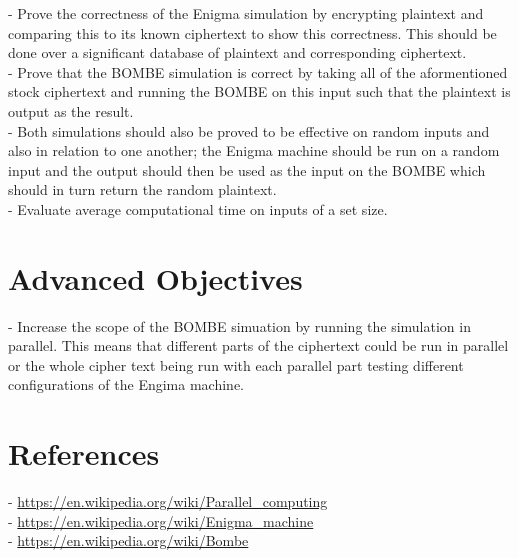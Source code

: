 \documentclass[a4paper, 11pt]{article}
\begin{document}
- Prove the correctness of the Enigma simulation by encrypting plaintext and comparing this to its known ciphertext to show this correctness. This should be done over a significant database of plaintext and corresponding  ciphertext.\\
- Prove that the BOMBE simulation is correct by taking all of the aformentioned stock ciphertext and running the BOMBE on this input such that the plaintext is output as the result.\\
- Both simulations should also be proved to be effective on random inputs and also in relation to one another; the Enigma machine should be run on a random input and the output should then be used as the input on the BOMBE which should in turn return the random plaintext.\\
- Evaluate average computational time on inputs of a set size.

\section*{Advanced Objectives}

- Increase the scope of the BOMBE simuation by running the simulation in parallel. This means that different parts of the ciphertext could be run in parallel or the whole cipher text being run with each parallel part testing different configurations of the Engima machine.

\section*{References}

- {\url{https://en.wikipedia.org/wiki/Parallel_computing}}\\
- {\url{https://en.wikipedia.org/wiki/Enigma_machine}}\\
- {\url{https://en.wikipedia.org/wiki/Bombe}}\\
\end{document}
